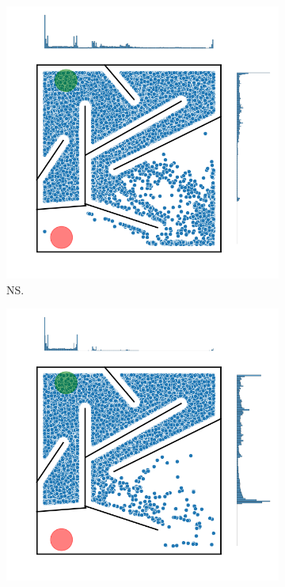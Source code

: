 \begin{figure}[H]
\begin{mdframed}
\begin{subfigure}[t]{0.5\textwidth}
            \includegraphics[scale=0.4]{resources/mazes/pure_novelty_hard_all.png}
            \caption{NS.}
        \end{subfigure}
        \begin{subfigure}[t]{0.5\textwidth}
            \includegraphics[scale=0.4]{resources/mazes/fitness_novelty_hard_all.png}

\end{subfigure}
\end{mdframed}
\end{figure}
